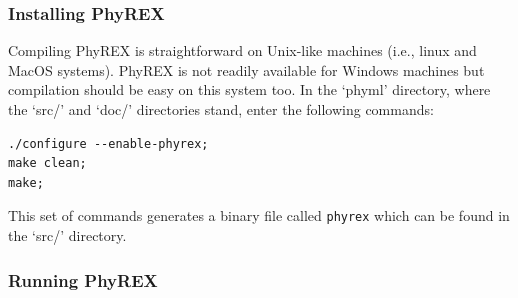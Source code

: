 \documentclass[a4paper,12pt]{article}
\newcommand{\x}[1]{\texttt{#1}}
\begin{document}
\subsubsection{Installing PhyREX}

Compiling PhyREX is straightforward on Unix-like  machines (i.e., linux and MacOS systems). PhyREX
is not readily available for Windows machines but  compilation should be easy on this system too. In
the `phyml' directory, where the `src/'  and `doc/' directories stand, enter the following commands:
{\setlength{\baselineskip}{0.5\baselineskip}
\begin{verbatim}
./configure --enable-phyrex;
make clean;
make;
\end{verbatim} } This set of commands generates  a binary file called \x{phyrex} which can be found
  in the `src/' directory.

\subsubsection{Running PhyREX}
\end{document}
